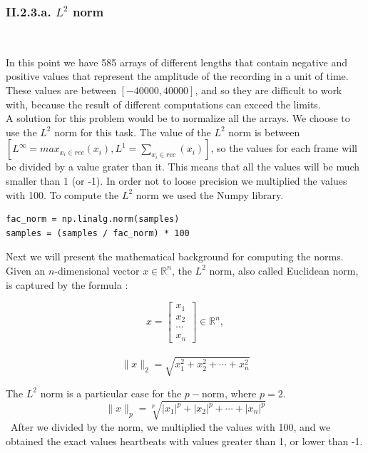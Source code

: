 \documentclass[11pt, a4papper]{report}
\theoremstyle{plain}
\theoremstyle{definition}
\theoremstyle{definition}
\theoremstyle{proposition}
\begin{document}
\subsubsection*{II.2.3.a. $L^2$ norm}

\

In this point we have 585 arrays of different lengths that contain negative and positive values that represent the amplitude of the recording in a unit of time. These values are between $[-40000,40000]$, and so they are difficult to work with, because the result of different computations can exceed the limits.
\\

A solution for this problem would be to normalize all the arrays. We choose to use the $L^2$ norm for this task. The value of the $L^2$ norm is between $[L^{\infty}=max_{x_i \in rec}(x_i),L^1=\sum_{x_i \in rec}(x_i)]$, so the values for each frame will be divided by a value grater than it. \cite{15} This means that all the values will be much smaller than 1 (or -1). In order not to loose precision we multiplied the values with 100. To compute the $L^2$ norm we used the Numpy library.

\begin{verbatim}
fac_norm = np.linalg.norm(samples)
samples = (samples / fac_norm) * 100
\end{verbatim}

Next we will present the mathematical background for computing the norms.
\\

Given an $n$-dimensional vector $x \in \mathbb{R}^n$, the $L^2$ norm, also called Euclidean norm, is captured by the formula :

\[
x = \begin{bmatrix}
    x_1\\
    x_2\\
    \cdots\\
    x_n
\end{bmatrix} \in \mathbb{R}^n,
\]
\
\[
\parallel x \parallel _2 = \sqrt{x_1^2+x_2^2+\cdots+x_n^2}
\]

The $L^2$ norm is a particular case for the $p-$norm, where $p=2$. \cite{16}
\[
\parallel x \parallel _p = \sqrt[p]{|x_1|^p+|x_2|^p+\cdots+|x_n|^p}
\]
\
After we divided by the norm, we multiplied the values with 100, and we obtained the exact values heartbeats with values greater than 1, or lower than -1.
\end{document}
